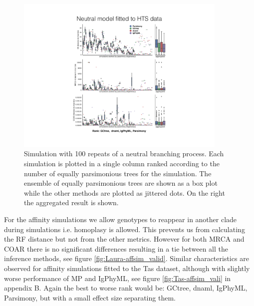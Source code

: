 \begin{figure}[!ht]
    \centering
    \includegraphics[width=0.9\textwidth]{figures/Laura-neutsim_valid.pdf}
    \caption{
        \label{fig:Laura-neutsim_valid}
        Simulation with 100 repeats of a neutral branching process.
        Each simulation is plotted in a single column ranked according to the number of equally parsimonious trees for the simulation.
        The ensemble of equally parsimonious trees are shown as a box plot while the other methods are plotted as jittered dots.
        On the right the aggregated result is shown.
    }
\end{figure}
\clearpage


For the affinity simulations we allow genotypes to reappear in another clade during simulations i.e. homoplasy is allowed.
This prevents us from calculating the RF distance but not from the other metrics.
However for both MRCA and COAR there is no significant differences resulting in a tie between all the inference methods, see figure \ref{fig:Laura-affsim_valid}.
Similar characteristics are observed for affinity simulations fitted to the Tas dataset, although with slightly worse performance of MP and IgPhyML, see figure \ref{fig:Tas-affsim_vali} in appendix B.
Again the best to worse rank would be: GCtree, dnaml, IgPhyML, Parsimony, but with a small effect size separating them.

